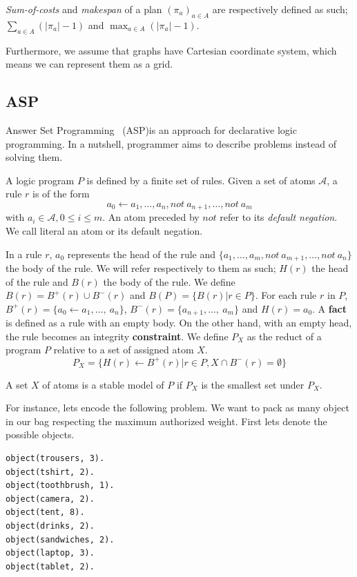 \textit{Sum-of-costs} and \textit{makespan} of a plan $(\pi_a)_{a\in A}$ are respectively defined as such; $\sum_{a\in A} (|\pi_a| - 1)$ and $\max_{a\in A} (|\pi_a| - 1)$.

Furthermore, we assume that graphs have Cartesian coordinate system, which means we can represent them as a grid. 

\subsection{ASP}

Answer Set Programming~\cite{ankolisc05a} (ASP)is an approach for declarative logic programming. In a nutshell, programmer aims to describe problems instead of solving them.

A logic program \(P\) is defined by a finite set of rules. Given a set of atoms \(\mathcal{A}\), a rule \(r\) is of the form 
\[
    a_0 \leftarrow a_1, \dots, a_n,not~a_{n+1}, \dots,not~a_m     
\] 
with \(a_i \in \mathcal{A}, 0 \leq i \leq m\). An atom preceded by \(not\) refer to its \textit{default negation}. We call literal an atom or its default negation.

In a rule \(r\), \(a_0\) represents the head of the rule and \(\{a_1, \dots, a_m,not~a_{m+1}, \dots,not~a_n\}\) the body of the rule. We will refer respectively to them as such; \(H(r)\) the head of the rule and \(B(r)\) the body of the rule. We define \(B(r) = B^+(r) \cup B^-(r) \) and \(B(P) = \{B(r) |r \in P\}\). For each rule \(r\) in \(P\), \(B^+(r) =\{ a_0 \leftarrow a_1, \dots, ~a_n\}\), \(B^-(r) =\{ a_{n+1}, \dots, ~a_m \}\) and \(H(r) = a_0\). 
A \textbf{fact} is defined as a rule with an empty body. On the other hand, with an empty head, the rule becomes an integrity \textbf{constraint}.
We define \(P_X\) as the reduct of a program \(P\) relative to a set of assigned atom \(X\).
\[
    P_X = \{H(r) \leftarrow B^+(r) | r \in P, X \cap B^-(r) = \emptyset\}
\]

A set \(X\) of atoms is a stable model of \(P\) if \(P_X\) is the smallest set under \(P_X\).



For instance, lets encode the following problem. We want to pack as many object in our bag respecting the maximum authorized weight. First lets denote the possible objects.

\begin{minipage}[H]{\linewidth}
\begin{lstlisting}[style=mystyle]
object(trousers, 3).
object(tshirt, 2).
object(toothbrush, 1).
object(camera, 2).
object(tent, 8).
object(drinks, 2).
object(sandwiches, 2).
object(laptop, 3).
object(tablet, 2).
\end{lstlisting}
\end{minipage}


